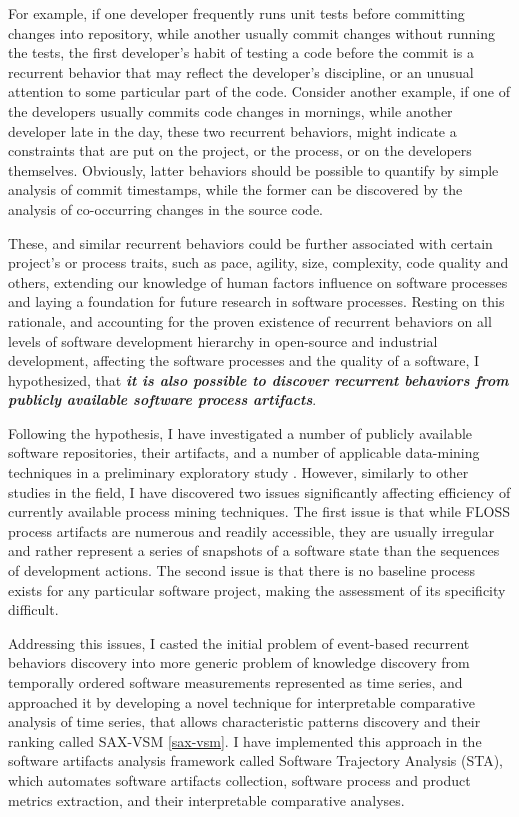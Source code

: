 For example, if one developer frequently runs unit tests before committing 
changes into repository, while another usually commit changes without running the tests, the first developer's
habit of testing a code before the commit is a recurrent behavior that may reflect the developer's discipline,
or an unusual attention to some particular part of the code. 
Consider another example, if one of the developers usually commits code changes in mornings, while another 
developer late in the day, these two recurrent behaviors, might indicate a constraints that are put on the 
project, or the process, or on the developers themselves.
Obviously, latter behaviors should be possible to quantify by simple analysis of commit timestamps, while 
the former can be discovered by the analysis of co-occurring changes in the source code. 

These, and similar recurrent behaviors could be further associated with certain project's or process 
traits, such as pace, agility, size, complexity, code quality and others, extending our knowledge of human 
factors influence on software processes and laying a foundation for future research in software processes.
Resting on this rationale, and accounting for the proven existence of recurrent behaviors 
on all levels of software development hierarchy \cite{citeulike:8347315} in open-source \cite{citeulike:200721}
and industrial \cite{citeulike:5090131} development, affecting the software processes and the quality 
of a software, I hypothesized, that \textbf{\textit{it is also possible to discover recurrent behaviors 
from publicly available software process artifacts}}. 

Following the hypothesis, I have investigated a number of publicly available software repositories,
their artifacts, and a number of applicable data-mining techniques in a preliminary exploratory study 
\cite{csdl2-10-09}. However, similarly to other studies in the field, I have discovered two issues 
significantly affecting efficiency of currently available process mining techniques. 
The first issue is that while FLOSS process artifacts are numerous and readily accessible, 
they are usually irregular and rather represent a series of snapshots of a software state 
than the sequences of development actions. 
The second issue is that there is no baseline process exists for any particular software project,
making the assessment of its specificity difficult.

Addressing this issues, I casted the initial problem of event-based recurrent behaviors 
discovery into more generic problem of knowledge discovery from temporally ordered software measurements 
represented as time series, and approached it by developing a novel technique for interpretable 
comparative analysis of time series, that allows characteristic patterns discovery and their ranking 
called SAX-VSM \ref{sax-vsm}. I have implemented this approach in the software artifacts analysis framework 
called Software Trajectory Analysis (STA), which automates software artifacts collection, software process and 
product metrics extraction, and their interpretable comparative analyses. 

